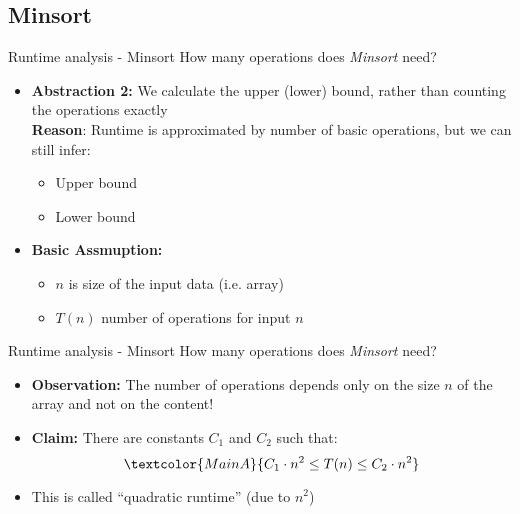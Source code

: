 
\subsection{Minsort}


\begin{frame}{Runtime analysis - Minsort}
  How many operations does \textit{Minsort} need?
  \begin{itemize}
    \item<1- |handout:1>
      \textbf{Abstraction 2:} We calculate the upper (lower) bound,
      rather than counting the operations exactly\\[0.5em]
      \textbf{Reason}: Runtime is approximated by number of basic operations,
      but we can still infer:
      \begin{itemize}
        \item {\color{MainBLight}Upper bound}
        \item {\color{MainBLight}Lower bound}
      \end{itemize}
      \vspace{1em}
    \item<2- |handout:1>
      \textbf{Basic Assmuption:}
      \begin{itemize}
        \item
          {\color{MainA}$n$} is size of the input data (i.e. array)
        \item
          {\color{MainA}$T(n)$} number of operations for input
          {\color{MainA}$n$}
      \end{itemize}
  \end{itemize}
\end{frame}


\begin{frame}{Runtime analysis - Minsort}
  How many operations does \textit{Minsort} need?
  \begin{itemize}
    \item<1- |handout:1>
      \textbf{Observation:}
      The number of operations depends only on the size
      {\color{MainA}$n$} of the array and not on the content!
    \item<2- |handout:1>
      \textbf{Claim:} There are constants {\color{MainA}$C_1$}
      and {\color{MainA}$C_2$} such that:
      \begin{displaymath}
        \textcolor{MainA}{C_1 \cdot n^2 \leq T(n) \leq C_2 \cdot n^2}
      \end{displaymath}%
    \item<3- |handout:1>
      This is called \enquote{quadratic runtime} (due to {\color{MainA}$n^2$})
  \end{itemize}
\end{frame}

